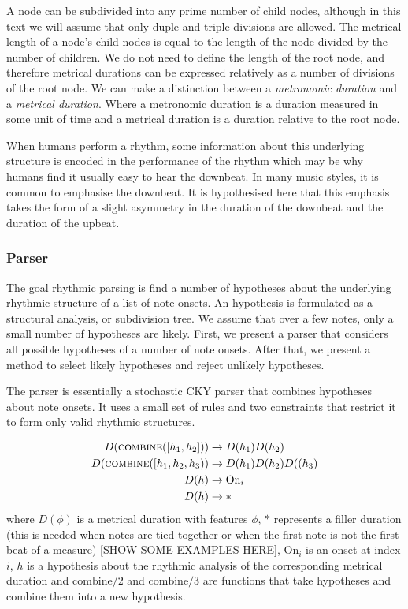 A node can be subdivided into any prime number of child nodes, although in this text we will assume that only duple and triple divisions are allowed. The metrical length of a node's child nodes is equal to the length of the node divided by the number of children. We do not need to define the length of the root node, and therefore metrical durations can be expressed relatively as a number of divisions of the root node. We can make a distinction between a \textit{metronomic duration} and a \textit{metrical duration}. Where a metronomic duration is a duration measured in some unit of time and a metrical duration is a duration relative to the root node. 

When humans perform a rhythm, some information about this underlying structure is encoded in the performance of the rhythm which may be why humans find it usually easy to hear the downbeat. In many music styles, it is common to emphasise the downbeat. It is hypothesised here that this emphasis takes the form of a slight asymmetry in the duration of the downbeat and the duration of the upbeat.

\subsubsection*{Parser}

The goal rhythmic parsing is find a number of hypotheses about the underlying rhythmic structure of a list of note onsets. An hypothesis is formulated as a structural analysis, or subdivision tree. We assume that over a few notes, only a small number of hypotheses are likely. First, we present a parser that considers all possible hypotheses of a number of note onsets. After that, we present a method to select likely hypotheses and reject unlikely hypotheses. 

The parser is essentially a stochastic CKY parser that combines hypotheses about note onsets. It uses a small set of rules and two constraints that restrict it to form only valid rhythmic structures. 

\begin{align*}
\label{eq:rules}
D(\textsc{combine}([h_1, h_2])) &\rightarrow D(h_1) D(h_2)\\
D(\textsc{combine}([h_1, h_2, h_3)) &\rightarrow D(h_1) D(h_2) D((h_3)\\
D(h) &\rightarrow \textrm{On}_i\\
D(h) &\rightarrow *
\end{align*}
where $D(\phi)$ is a metrical duration with features $\phi$, $*$ represents a filler duration (this is needed when notes are tied together or when the first note is not the first beat of a measure) [SHOW SOME EXAMPLES HERE], $\textrm{On}_i$ is an onset at index $i$, $h$ is a hypothesis about the rhythmic analysis of the corresponding metrical duration and $\textrm{combine}/2$ and $\textrm{combine}/3$ are functions that take hypotheses and combine them into a new hypothesis.

